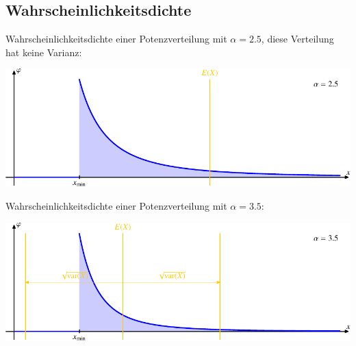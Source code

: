 \subsection{Wahrscheinlichkeitsdichte}
Wahrscheinlichkeitsdichte einer Potenzverteilung mit $\alpha=2.5$,
diese Verteilung hat keine Varianz:
\begin{center}
\includegraphics{images/power-2.pdf}
\end{center}

Wahrscheinlichkeitsdichte einer Potenzverteilung mit $\alpha=3.5$:
\begin{center}
\includegraphics{images/power-3.pdf}
\end{center}

